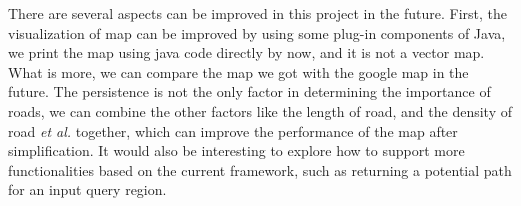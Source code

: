 \documentclass[11pt]{article}
\begin{document}
There are several aspects can be improved in this project in the future. First, the visualization of map can be improved by using some plug-in components of Java, we print the map using java code directly by now, and it is not a vector map.  What is more, we can compare the map we got with the google map in the future.  The persistence is not the only factor in determining the importance of roads, we can combine the other factors like the length of road, and the density of road \textit{et al.} together, which can improve the performance of the map after simplification.
It would also be interesting to explore how to support more functionalities
based on the current framework, such as returning a potential
path for an input query region.







{}

\end{document}
